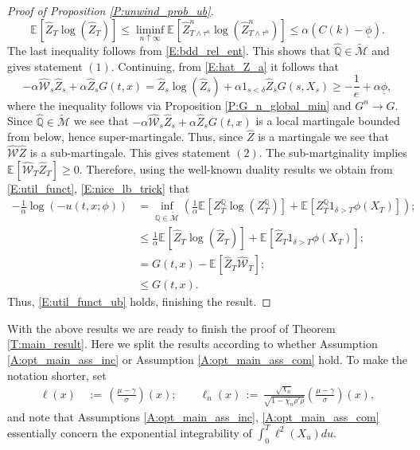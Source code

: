 \documentclass[11pt, letterpaper]{amsart}
\theoremstyle{definition}
\theoremstyle{remark}
\numberwithin{equation}{section}
\newcommand{\We}{\mathcal{W}}
\newcommand{\hwe}{\hat{\We}}
\newcommand{\hz}{\hat{Z}}
\newcommand{\hqprob}{\hat{\qprob}}
\newcommand{\qprob}{\mathbb{Q}}
\newcommand{\esp}{\mathbb{E}}
\newcommand{\espalt}[2]{\esp^{#1}\bra{#2}}
\newcommand{\tM}{\widetilde{\mathcal{M}}}
\newcommand{\dfn}{\, := \,}
\newcommand{\bra}[1]{\left[#1\right]}
\newcommand{\ul}[1]{\underline{#1}}
\begin{document}
\begin{proof}[Proof of Proposition \ref{P:unwind_prob_ub}]
\begin{equation*}
\espalt{}{\hz_T\log(\hz_T)} \leq \liminf_{n\uparrow\infty} \espalt{}{\hz^n_{T\wedge\tau^n}\log\left(\hz^n_{T\wedge\tau^n}\right)} \leq \alpha(C(k)-\ul{\phi}).
\end{equation*}
The last inequality follows from \eqref{E:bdd_rel_ent}.  This shows that $\hqprob\in\tM$ and gives statement $(1)$. Continuing, from \eqref{E:hat_Z_a} it follows that
\begin{equation}\label{E:nice_lb_trick}
-\alpha \hwe_s \hz_s + \alpha \hz_s G(t,x) = \hz_s\log(\hz_s) + \alpha 1_{s<\delta} \hz_s G(s,X_s) \geq -\frac{1}{e} + \alpha\ul{\phi},
\end{equation}
where the inequality follows via Proposition \ref{P:G_n_global_min} and $G^n \rightarrow G$.  Since $\hqprob\in\tM$ we see that $-\alpha \hwe_s\hz_s + \alpha \hz_s G(t,x)$ is a local martingale bounded from below, hence super-martingale.  Thus, since $\hz$ is a martingale we see that $\hwe\hz$ is a sub-martingale.  This gives statement $(2)$. The sub-martginality implies $\espalt{}{\hwe_T \hz_T} \geq 0$.  Therefore, using the well-known duality results we obtain from \eqref{E:util_funct}, \eqref{E:nice_lb_trick} that
\begin{equation}\label{E:big_ub}
\begin{split}
-\frac{1}{\alpha}\log\left(-u(t,x;\phi)\right) &=\inf_{\qprob\in\tM}\left(\frac{1}{\alpha}\espalt{}{Z^{\qprob}_T\log\left(Z^{\qprob}_T\right)} + \espalt{}{Z^{\qprob}_T 1_{\delta > T}\phi(X_T)}\right);\\
&\leq \frac{1}{\alpha}\espalt{}{\hz_T\log(\hz_T)} + \espalt{}{\hz_T 1_{\delta > T}\phi(X_T)};\\
&=G(t,x) - \espalt{}{\hz_T\hwe_T};\\
&\leq G(t,x).
\end{split}
\end{equation}
Thus, \eqref{E:util_funct_ub} holds, finishing the result.

\end{proof}

With the above results we are ready to finish the proof of Theorem \ref{T:main_result}.  Here we split the results according to whether  Assumption \ref{A:opt_main_ass_inc} or Assumption \ref{A:opt_main_ass_com} hold. To make the notation shorter, set
\begin{equation}\label{E:ell_n_def}
\begin{split}
\ell(x) &\dfn \left(\frac{\mu-\gamma}{\sigma}\right)(x);\qquad \ell_n(x) \dfn \frac{\sqrt{\chi_n}}{\sqrt{1-\chi_n\rho'\rho}}\left(\frac{\mu-\gamma}{\sigma}\right)(x),
\end{split}
\end{equation}
and note that Assumptions \ref{A:opt_main_ass_inc}, \ref{A:opt_main_ass_com} essentially concern the exponential integrability of $\int_0^T \ell^2(X_u)du$.
\end{document}

